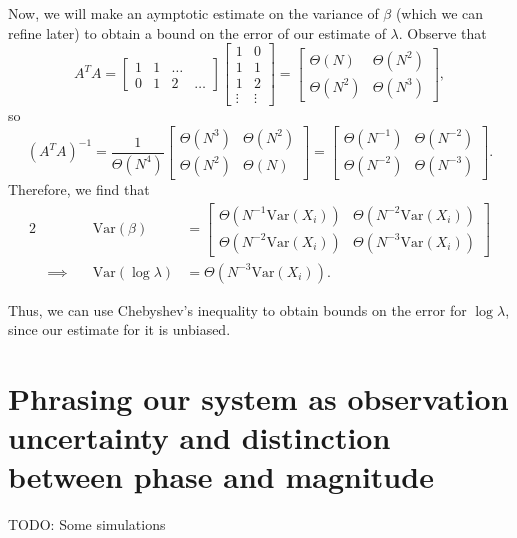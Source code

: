 \documentclass[letterpaper]{article}
\theoremstyle{remark}
\newcommand{\Var}[1]{\mathrm{Var}({#1})}
\newcommand{\mat}[1]{\ensuremath{\begin{bmatrix}#1\end{bmatrix}}}
\newcommand{\eqn}[1]{\begin{alignat*}{2}#1\end{alignat*}}
\newcommand*{\thus}{&\implies\quad&}
\begin{document}
Now, we will make an aymptotic estimate on the variance of $\beta$ (which we can refine later) to obtain a bound on the error of our estimate of $\lambda$. Observe that
\[
    A^TA = \mat{1 & 1 & \ldots \\ 0 & 1 & 2 & \ldots} \mat{1 & 0 \\ 1 & 1 \\ 1 & 2 \\ \vdots & \vdots} = \mat{\Theta(N) & \Theta(N^2) \\ \Theta(N^2) & \Theta(N^3)},
\]
so
\[
    (A^TA)^{-1} = \frac{1}{\Theta(N^4)} \mat{\Theta(N^3) & \Theta(N^2) \\ \Theta(N^2) & \Theta(N)} = \mat{\Theta(N^{-1}) & \Theta(N^{-2}) \\ \Theta(N^{-2}) & \Theta(N^{-3})}.
\]
Therefore, we find that
\eqn{
    && \Var{\beta} &= \mat{\Theta(N^{-1}\Var{X_i}) & \Theta(N^{-2}\Var{X_i}) \\ \Theta(N^{-2}\Var{X_i}) & \Theta(N^{-3}\Var{X_i})} \\
    \thus \Var{\log{\lambda}} &= \Theta(N^{-3}\Var{X_i}).
}

Thus, we can use Chebyshev's inequality to obtain bounds on the error for $\log{\lambda}$, since our estimate for it is unbiased.

\section*{Phrasing our system as observation uncertainty and distinction between phase and magnitude}
TODO: Some simulations
\end{document}
